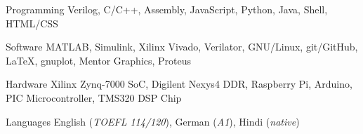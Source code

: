 
\begin{cvskills}

\cvskill
	{Programming} %
	{Verilog, C/C++, Assembly, JavaScript, Python, Java, Shell, HTML/CSS} %

\cvskill
	{Software} %
	{MATLAB, Simulink, Xilinx Vivado, Verilator, GNU/Linux, git/GitHub, \LaTeX, gnuplot, Mentor Graphics, Proteus} %

\cvskill
	{Hardware} %
	{Xilinx Zynq-7000 SoC, Digilent Nexys4 DDR, Raspberry Pi, Arduino, PIC Microcontroller, TMS320 DSP Chip} %

\cvskill
	{Languages} %
	{English (\textit{TOEFL 114/120}), German (\textit{A1}), Hindi (\textit{native})} %

\end{cvskills}
